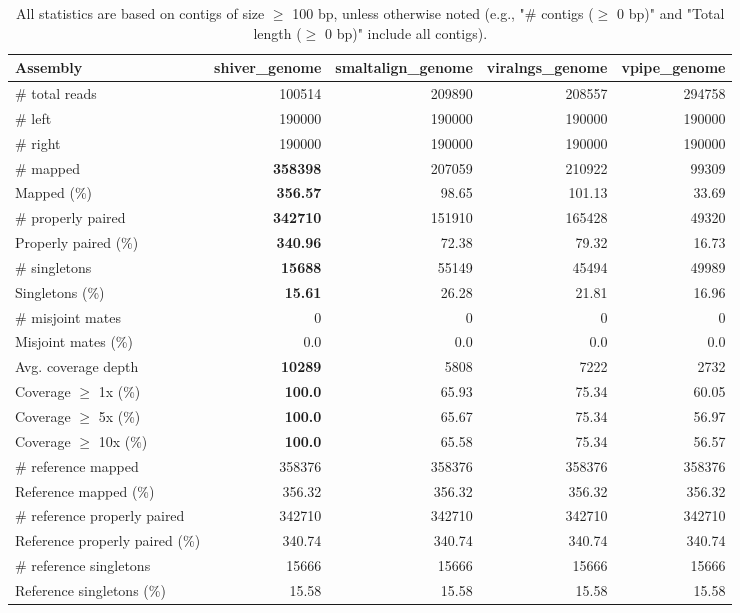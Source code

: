 \documentclass[12pt,a4paper]{article}
\begin{document}
\begin{table}[ht]
\begin{center}
\caption{All statistics are based on contigs of size $\geq$ 100 bp, unless otherwise noted (e.g., "\# contigs ($\geq$ 0 bp)" and "Total length ($\geq$ 0 bp)" include all contigs).}
\begin{tabular}{|l*{4}{|r}|}
\hline
Assembly & shiver\_genome & smaltalign\_genome & viralngs\_genome & vpipe\_genome \\ \hline
\# total reads & 100514 & 209890 & 208557 & 294758 \\ \hline
\# left & 190000 & 190000 & 190000 & 190000 \\ \hline
\# right & 190000 & 190000 & 190000 & 190000 \\ \hline
\# mapped & {\bf 358398} & 207059 & 210922 & 99309 \\ \hline
Mapped (\%) & {\bf 356.57} & 98.65 & 101.13 & 33.69 \\ \hline
\# properly paired & {\bf 342710} & 151910 & 165428 & 49320 \\ \hline
Properly paired (\%) & {\bf 340.96} & 72.38 & 79.32 & 16.73 \\ \hline
\# singletons & {\bf 15688} & 55149 & 45494 & 49989 \\ \hline
Singletons (\%) & {\bf 15.61} & 26.28 & 21.81 & 16.96 \\ \hline
\# misjoint mates & 0 & 0 & 0 & 0 \\ \hline
Misjoint mates (\%) & 0.0 & 0.0 & 0.0 & 0.0 \\ \hline
Avg. coverage depth & {\bf 10289} & 5808 & 7222 & 2732 \\ \hline
Coverage $\geq$ 1x (\%) & {\bf 100.0} & 65.93 & 75.34 & 60.05 \\ \hline
Coverage $\geq$ 5x (\%) & {\bf 100.0} & 65.67 & 75.34 & 56.97 \\ \hline
Coverage $\geq$ 10x (\%) & {\bf 100.0} & 65.58 & 75.34 & 56.57 \\ \hline
\# reference mapped & 358376 & 358376 & 358376 & 358376 \\ \hline
Reference mapped (\%) & 356.32 & 356.32 & 356.32 & 356.32 \\ \hline
\# reference properly paired & 342710 & 342710 & 342710 & 342710 \\ \hline
Reference properly paired (\%) & 340.74 & 340.74 & 340.74 & 340.74 \\ \hline
\# reference singletons & 15666 & 15666 & 15666 & 15666 \\ \hline
Reference singletons (\%) & 15.58 & 15.58 & 15.58 & 15.58 \\ \hline

\end{tabular}
\end{center}
\end{table}
\end{document}
